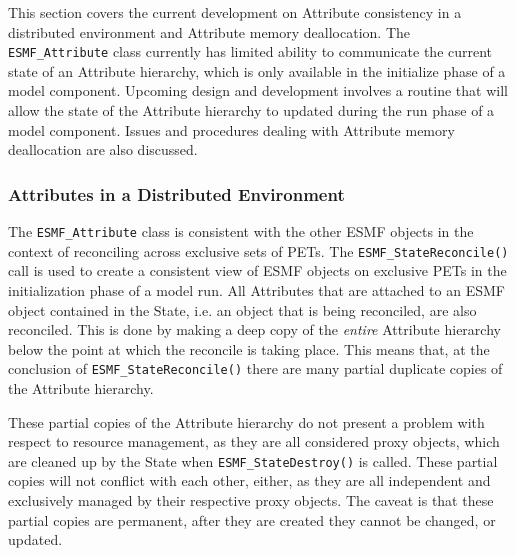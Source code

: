 %

This section covers the current development on Attribute consistency in a distributed environment and Attribute memory deallocation.  The {\tt ESMF\_Attribute} class currently has limited ability to communicate the current state of an Attribute hierarchy, which is only available in the initialize phase of a model component.  Upcoming design and development involves a routine that will allow the state of the Attribute hierarchy to updated during the run phase of a model component.  Issues and procedures dealing with Attribute memory deallocation are also discussed.

\subsubsection{Attributes in a Distributed Environment} 
\label{sec:Att:Dist}

The  {\tt ESMF\_Attribute} class is consistent with the other ESMF objects in the context of reconciling across exclusive sets of PETs.  The {\tt ESMF\_StateReconcile()} call is used to create a consistent view of ESMF objects on exclusive PETs in the initialization phase of a model run.  All Attributes that are attached to an ESMF object contained in the State, i.e. an object that is being reconciled, are also reconciled.  This is done by making a deep copy of the {\it entire} Attribute hierarchy below the point at which the reconcile is taking place.  This means that, at the conclusion of {\tt ESMF\_StateReconcile()} there are many partial duplicate copies of the Attribute hierarchy.

These partial copies of the Attribute hierarchy do not present a problem with respect to resource management, as they are all considered proxy objects, which are cleaned up by the State when {\tt ESMF\_StateDestroy()} is called.  These partial copies will not conflict with each other, either, as they are all independent and exclusively managed by their respective proxy objects.  The caveat is that these partial copies are permanent, after they are created they cannot be changed, or updated.

